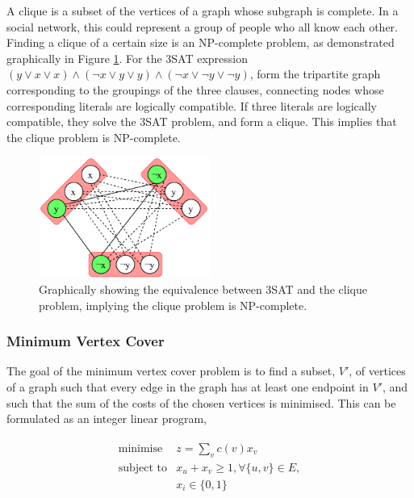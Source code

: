 \documentclass[11pt]{amsart}
\begin{document}
A clique is a subset of the vertices of a graph whose subgraph is complete. In a social network, this could represent a group of people who all know each other.  Finding a clique of a certain size is an NP-complete problem, as demonstrated graphically in Figure \ref{fig:clique}. For the 3SAT expression $(y \lor x \lor x) \land (\neg x \lor y \lor y) \land (\neg x \lor \neg y \lor \neg y)$, form the tripartite graph corresponding to the groupings of the three clauses, connecting nodes whose corresponding literals are logically compatible. If three literals are logically compatible, they solve the 3SAT problem, and form a clique. This implies that the clique problem is NP-complete.

\begin{figure}[!ht]
\centering
\includegraphics[width=0.5\textwidth]{Figures/clique.pdf}
\caption{Graphically showing the equivalence between 3SAT and the clique problem, implying the clique problem is NP-complete.}
\label{fig:clique}
\end{figure}

\subsubsection{Minimum Vertex Cover}

The goal of the minimum vertex cover problem is to find a subset, $V'$, of vertices of a graph such that every edge in the graph has at least one endpoint in $V'$, and such that the sum of the costs of the chosen vertices is minimised. This can be formulated as an integer linear program,

\begin{align}
\begin{array}{rl}
\text{minimise} & z = \sum_v c(v)x_v \\
\text{subject to} & x_u + x_v \geq 1, \forall \{u, v\} \in E, \\
& x_i \in \{0, 1\}
\end{array}
\label{eq:vertexcover}
\end{align}
\end{document}
